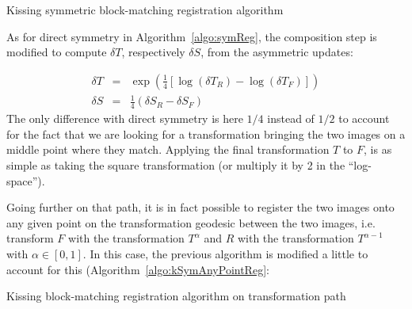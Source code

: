 \documentclass[a4paper]{article}
\begin{document}
\begin{algorithm}[!htbp]
\caption{Kissing symmetric block-matching registration algorithm}
\label{algo:kSymReg}
\begin{algorithmic}[1]
    \ENDFOR
  \ENDFOR
\end{algorithmic}
\end{algorithm}
As for direct symmetry in Algorithm~\ref{algo:symReg}, the composition step is modified to compute $\delta T$, respectively $\delta S$, from the asymmetric updates:

\begin{eqnarray}
	\delta T & = & \exp\left(\frac{1}{4} \left[\log(\delta T_R) - \log(\delta T_F)\right] \right) \\
	\delta S & = & \frac{1}{4} \left(\delta S_R - \delta S_F\right)
\end{eqnarray}
The only difference with direct symmetry is here $1/4$ instead of $1/2$ to account for the fact that we are looking for a transformation bringing the two images on a middle point where they match. Applying the final transformation $T$ to $F$, is as simple as taking the square transformation (or multiply it by 2 in the ``log-space'').

Going further on that path, it is in fact possible to register the two images onto any given point on the transformation geodesic between the two images, i.e. transform $F$ with the transformation $T^{\alpha}$ and $R$ with the transformation $T^{\alpha - 1}$ with $\alpha \in [0,1]$. In this case, the previous algorithm is modified a little to account for this (Algorithm~\ref{algo:kSymAnyPointReg}:

\begin{algorithm}[!htbp]
\caption{Kissing block-matching registration algorithm on transformation path}
\label{algo:kSymAnyPointReg}
\begin{algorithmic}[1]
    \ENDFOR
  \ENDFOR
\end{algorithmic}
\end{algorithm}
\end{document}
